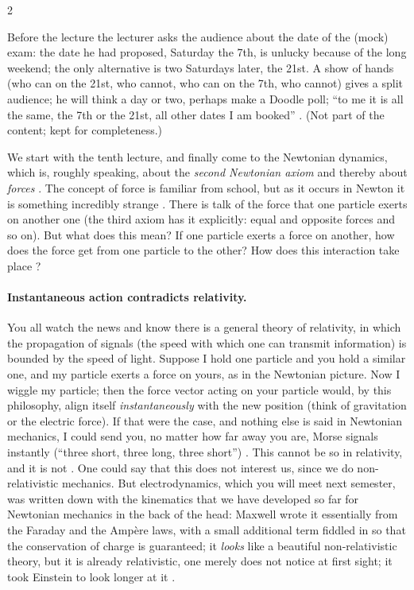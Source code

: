 \begin{paracol}{2}
\begin{aside}
Before the lecture the lecturer asks the audience about the date of the (mock) exam: the date he had proposed, Saturday the 7th, is unlucky because of the long weekend; the only alternative is two Saturdays later, the 21st. A show of hands (who
can on the 21st, who cannot, who can on the 7th, who cannot) gives a split audience; he will think a day or two, perhaps make a Doodle poll; ``to me it is all the same, the 7th or the 21st, all other dates I am booked'' .
(Not part of the content; kept for completeness.)
\end{aside}

We start with the tenth lecture, and finally come to the Newtonian dynamics, which is, roughly speaking, about the \emph{second Newtonian axiom} and thereby about \emph{forces} .
The concept of force is familiar from school, but as it occurs in Newton it is something incredibly strange . There is talk of the force that one particle exerts on another one (the third axiom has it explicitly:
equal and opposite forces and so on). But what does this mean? If one particle exerts a force on another, how does the force get from one particle to the other? How does this interaction take place ?

\paragraph{Instantaneous action contradicts relativity.} You all watch the news and know there is a general theory of relativity, in which the propagation of signals (the speed with which one can transmit information) is bounded by the speed of light.
Suppose I hold one particle and you hold a similar one, and my particle exerts a force on yours, as in the Newtonian picture. Now I wiggle my particle; then the force vector acting on your particle would, by this philosophy, align
itself \emph{instantaneously} with the new position (think of gravitation or the electric force). If that were the case, and nothing else is said in Newtonian mechanics, I could send you, no matter how far away you are, Morse signals
instantly (``three short, three long, three short'') . This cannot be so in relativity, and it is not .
One could say that this does not interest us, since we do non-relativistic mechanics. But electrodynamics, which you will meet next semester, was written down with the kinematics that we have developed so far for Newtonian mechanics in the back of the head:
Maxwell wrote it essentially from the Faraday and the Amp\`ere laws, with a small additional term fiddled in so that the conservation of charge is guaranteed; it \emph{looks} like a beautiful non-relativistic theory, but it is already relativistic, one merely does not
notice at first sight; it took Einstein to look longer at it .


\end{paracol}
